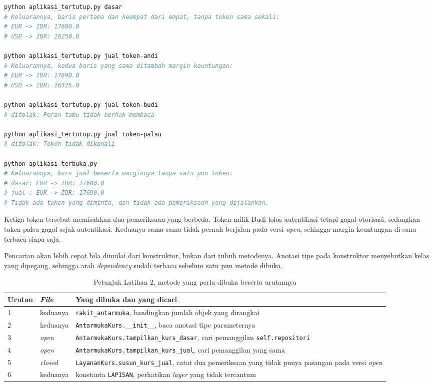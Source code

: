\begin{lstlisting}[language=bash, caption={Menjalankan kedua aplikasi, keduanya
  tersedia di \berkas{sources/chapter02/}}, label=lst:periksa-arah]
python aplikasi_tertutup.py dasar
# Keluarannya, baris pertama dan keempat dari empat, tanpa token sama sekali:
# EUR -> IDR: 17600.0
# USD -> IDR: 16250.0

python aplikasi_tertutup.py jual token-andi
# Keluarannya, kedua baris yang sama ditambah margin keuntungan:
# EUR -> IDR: 17690.0
# USD -> IDR: 16325.0

python aplikasi_tertutup.py jual token-budi
# ditolak: Peran tamu tidak berhak membaca

python aplikasi_tertutup.py jual token-palsu
# ditolak: Token tidak dikenali

python aplikasi_terbuka.py
# Keluarannya, kurs jual beserta marginnya tanpa satu pun token:
# dasar: EUR -> IDR: 17600.0
# jual : EUR -> IDR: 17690.0
# Tidak ada token yang diminta, dan tidak ada pemeriksaan yang dijalankan.
\end{lstlisting}

Ketiga token tersebut memisahkan dua pemeriksaan yang berbeda. Token milik
Budi lolos autentikasi tetapi gagal otorisasi, sedangkan token palsu gagal
sejak autentikasi. Keduanya sama-sama tidak pernah berjalan pada versi
\textit{open}, sehingga margin keuntungan di sana terbaca siapa saja.

Pencarian akan lebih cepat bila dimulai dari konstruktor, bukan dari tubuh
metodenya. Anotasi tipe pada konstruktor menyebutkan kelas yang dipegang,
sehingga arah \textit{dependency} sudah terbaca sebelum satu pun metode dibuka.

\begin{table}[htbp]
  \centering
  \caption{Petunjuk Latihan 2, metode yang perlu dibuka beserta urutannya}
  \label{tab:lat2-petunjuk}
  \begin{tabularx}{\textwidth}{|l|l|X|}
    \hline
    \textbf{Urutan} & \textbf{\textit{File}} & \textbf{Yang dibuka dan yang dicari} \\
    \hline
    1 & keduanya & \texttt{rakit\_antarmuka}, bandingkan jumlah objek yang dirangkai \\
    \hline
    2 & keduanya & \texttt{AntarmukaKurs.\_\_init\_\_}, baca anotasi tipe parameternya \\
    \hline
    3 & \textit{open} & \texttt{AntarmukaKurs.tampilkan\_kurs\_dasar}, cari pemanggilan \texttt{self.repositori} \\
    \hline
    4 & \textit{open} & \texttt{AntarmukaKurs.tampilkan\_kurs\_jual}, cari pemanggilan yang sama \\
    \hline
    5 & \textit{closed} & \texttt{LayananKurs.susun\_kurs\_jual}, catat dua pemeriksaan yang tidak punya pasangan pada versi \textit{open} \\
    \hline
    6 & keduanya & konstanta \texttt{LAPISAN}, perhatikan \textit{layer} yang tidak tercantum \\
    \hline
  \end{tabularx}
\end{table}

